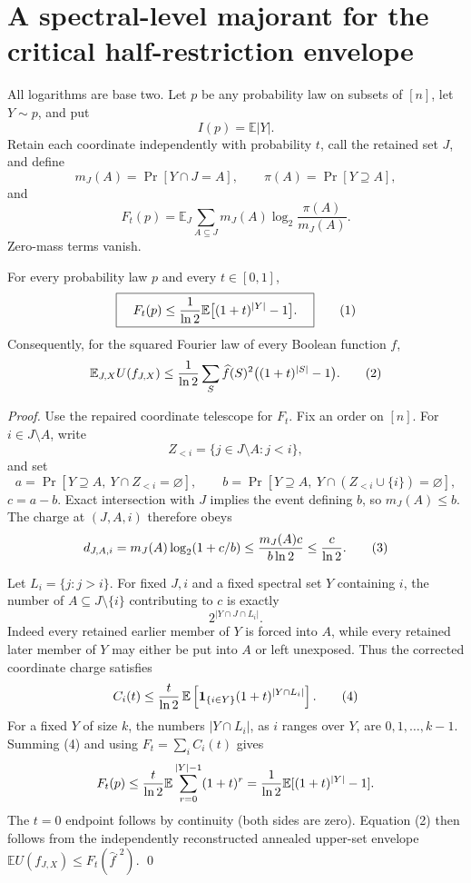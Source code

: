 \section*{A spectral-level majorant for the critical half-restriction envelope}

All logarithms are base two. Let $p$ be any probability law on subsets of
$[n]$, let $Y\sim p$, and put
\[
 I(p)=\mathbb E|Y|.
\]
Retain each coordinate independently with probability $t$, call the retained
set $J$, and define
\[
 m_J(A)=\Pr[Y\cap J=A],\qquad
 \pi(A)=\Pr[Y\supseteq A],
\]
and
\[
 F_t(p)=\mathbb E_J\sum_{A\subseteq J}
 m_J(A)\log_2\frac{\pi(A)}{m_J(A)}.
\]
Zero-mass terms vanish.

\begin{theorem}
For every probability law $p$ and every $t\in[0,1]$,
\[
 \boxed{\quad F_t(p)\le {1\over\ln2}
 \mathbb E\bigl[(1+t)^{|Y|}-1\bigr].\quad}             \tag{1}
\]
Consequently, for the squared Fourier law of every Boolean function $f$,
\[
 \mathbb E_{J,X}U(f_{J,X})
 \le {1\over\ln2}\sum_S\widehat f(S)^2
       \bigl((1+t)^{|S|}-1\bigr).                      \tag{2}
\]
\end{theorem}

\begin{proof}
Use the repaired coordinate telescope for $F_t$. Fix an order on $[n]$.
For $i\in J\setminus A$, write
\[
 Z_{<i}=\{j\in J\setminus A:j<i\},
\]
and set
\[
 a=\Pr[Y\supseteq A,\ Y\cap Z_{<i}=\varnothing],\qquad
 b=\Pr[Y\supseteq A,\ Y\cap(Z_{<i}\cup\{i\})=\varnothing],
\]
$c=a-b$.  Exact intersection with $J$ implies the event defining $b$, so
$m_J(A)\le b$.  The charge at $(J,A,i)$ therefore obeys
\[
 d_{J,A,i}=m_J(A)\log_2(1+c/b)
 \le {m_J(A)c\over b\ln2}\le {c\over\ln2}.             \tag{3}
\]

Let $L_i=\{j:j>i\}$.  For fixed $J,i$ and a fixed spectral set $Y$ containing
$i$, the number of $A\subseteq J\setminus\{i\}$ contributing to $c$ is
exactly
\[
 2^{|Y\cap J\cap L_i|}.
\]
Indeed every retained earlier member of $Y$ is forced into $A$, while every
retained later member of $Y$ may either be put into $A$ or left unexposed.
Thus the corrected coordinate charge satisfies
\[
 C_i(t)\le {t\over\ln2}\,
 \mathbb E\left[\mathbf1_{\{i\in Y\}}
 (1+t)^{|Y\cap L_i|}\right].                           \tag{4}
\]
For a fixed $Y$ of size $k$, the numbers $|Y\cap L_i|$, as $i$ ranges over
$Y$, are $0,1,\ldots,k-1$. Summing (4) and using
$F_t=\sum_iC_i(t)$ gives
\[
 F_t(p)\le {t\over\ln2}\mathbb E\sum_{r=0}^{|Y|-1}(1+t)^r
 ={1\over\ln2}\mathbb E[(1+t)^{|Y|}-1].
\]
The $t=0$ endpoint follows by continuity (both sides are zero). Equation (2)
then follows from the independently reconstructed annealed upper-set envelope
$\mathbb E U(f_{J,X})\le F_t(\widehat f^{,2})$. \qed
\end{proof}

